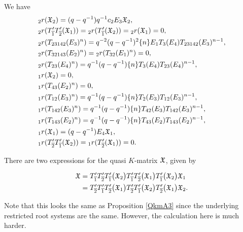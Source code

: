 \documentclass[a4 paper, 10pt]{article}
\begin{document}
\begin{lemma}
We have
\begin{align*}
&	{}_{2}r(\mathfrak{X}_2)		=	(q-q^{-1})q^{-1}c_2E_3\mathfrak{X}_2,\\
&	{}_{2}r(T_{\overline{1}}^{\prime}T_{\overline{2}}^{\prime}(\mathfrak{X}_1))	=	{}_{2}r(T_{\overline{1}}^{\prime}(\mathfrak{X}_2))	=	{}_{2}r(\mathfrak{X}_1)	=	0,\\
&	{}_{2}r(T_{23142}(E_3)^n)	=	q^{-2}(q-q^{-1})^2\{n \}E_1T_3(E_4)T_{23142}(E_3)^{n-1},\\
& 	{}_{2}r(T_{32143}(E_2)^n)	=	{}_{2}r(T_{32}(E_1)^n)	=	0,\\
&	{}_{2}r(T_{23}(E_4)^n)	=	q^{-1}(q-q^{-1})\{n \}T_3(E_4)T_{23}(E_4)^{n-1},\\
&	{}_{1}r(\mathfrak{X}_2)	=	0,\\
&	{}_{1}r(T_{43}(E_2)^n)	=	0,\\
&	{}_{1}r(T_{12}(E_3)^n)	=	q^{-1}(q-q^{-1})\{ n \} T_2(E_3)T_{12}(E_3)^{n-1},\\
&	{}_{1}r(T_{142}(E_3)^n)	=	q^{-1}(q-q^{-1})\{ n \} T_{42}(E_3)T_{142}(E_3)^{n-1},\\
&	{}_{1}r(T_{143}(E_2)^n)	=	q^{-1}(q-q^{-1})\{ n \} T_{43}(E_2)T_{143}(E_2)^{n-1},\\
&	{}_{1}r(\mathfrak{X}_1)	=	(q-q^{-1})E_4\mathfrak{X}_1,\\
&	{}_{1}r(T_{\overline{2}}^{\prime}T_{\overline{1}}^{\prime}(\mathfrak{X}_2))	=	{}_{1}r(T_{\overline{2}}^{\prime}(\mathfrak{X}_1))	=	0.
\end{align*}
\end{lemma}
\begin{proposition} \label{QkmA4}
There are two expressions for the quasi $K$-matrix $\mathfrak{X}$, given by 

\begin{align}
	\mathfrak{X} &= T_{\overline{1}}^{\prime}T_{\overline{2}}^{\prime}T_{\overline{1}}^{\prime}\big( \mathfrak{X}_2 \big) T_{\overline{1}}^{\prime}T_{\overline{2}}^{\prime}\big( \mathfrak{X}_1 \big) T_{\overline{1}}^{\prime}\big( \mathfrak{X}_2 \big) \mathfrak{X}_1\\
		&= T_{\overline{2}}^{\prime}T_{\overline{1}}^{\prime}T_{\overline{2}}^{\prime}\big( \mathfrak{X}_1 \big) T_{\overline{2}}^{\prime}T_{\overline{1}}^{\prime}\big( \mathfrak{X}_2 \big) T_{\overline{2}}^{\prime}\big( \mathfrak{X}_1 \big) \mathfrak{X}_2.
\end{align}
\end{proposition}

\noindent Note that this looks the same as Proposition \ref{QkmA3} since the underlying restricted root systems are the same. However, the calculation here is much harder.
\end{document}
